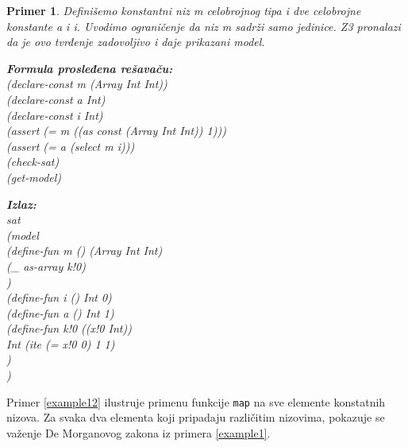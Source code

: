 \documentclass[12pt,oneside]{memoir}
\newcommand\tab[1][0.5cm]{\hspace*{#1}}
\newtheorem{primer}{Primer}
\begin{document}
\begin{primer} \label{example11} Definišemo konstantni niz m celobrojnog tipa i dve celobrojne konstante a i i. Uvodimo ograničenje da niz m sadrži samo jedinice. Z3 pronalazi da je ovo tvrđenje zadovoljivo i daje prikazani model.\\
\begin{minipage}[b]{0.55\textwidth}
\vspace{0.5cm} 
\textbf{Formula prosleđena rešavaču:}
\\(declare-const m (Array Int Int))
\\(declare-const a Int)
\\(declare-const i Int)
\\(assert (= m ((as const (Array Int Int)) 1)))
\\(assert (= a (select m i)))
\\(check-sat)
\\(get-model)
\end{minipage}
\hspace{1.1cm} 
\begin{minipage}[t]{0.5\textwidth}
\vspace{-4.7cm}
\textbf{Izlaz:}
\\sat 
\\(model 
\\\tab(define-fun m () (Array Int Int) 
\\\tab\tab(\_ as-array k!0)
\\\tab) 
\\\tab(define-fun i () Int 0) 
\\\tab(define-fun a () Int 1) 
\\\tab(define-fun k!0 ((x!0 Int)) 
\\\tab\tab Int (ite (= x!0 0) 1 1)
\\\tab)
\\)
\end{minipage}
\end{primer}
\par
Primer \ref{example12} ilustruje primenu funkcije \texttt{map} na sve elemente konstatnih nizova. Za svaka dva elementa koji pripadaju različitim nizovima, pokazuje se važenje De Morganovog zakona iz primera \ref{example1}. 
\end{document}
